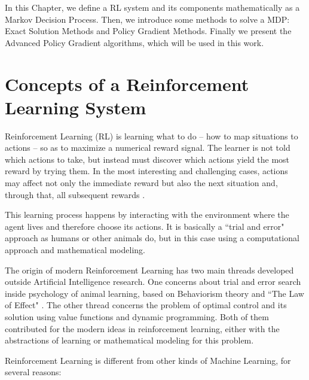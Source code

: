 In this Chapter, we define a RL system and its components mathematically as a Markov Decision Process. Then, we introduce some methods to solve a MDP: Exact Solution Methods and Policy Gradient Methods. Finally we present the Advanced Policy Gradient algorithms, which will be used in this work.

\section{Concepts of a Reinforcement Learning System} \label{sec:rlconcepts}

Reinforcement Learning (RL) is learning what to do -- how to map situations to actions -- so as to maximize
a numerical reward signal. The learner is not told which actions to take, but instead must discover
which actions yield the most reward by trying them. In the most interesting and challenging cases,
actions may affect not only the immediate reward but also the next situation and, through that, all
subsequent rewards \cite{sutton1998rli}.

This learning process happens by interacting with the environment where the agent lives and therefore choose its actions. It is basically a ``trial and error" approach as humans or other animals do, but in this case using a computational approach and mathematical modeling.

The origin of modern Reinforcement Learning has two main threads developed outside Artificial Intelligence research. One concerns about trial and error search inside psychology of animal learning, based on Behaviorism theory \cite{skinner1953science} and ``The Law of Effect" \cite{Thorndike173}. The other thread concerns the problem of optimal control and its solution using value functions
and dynamic programming. Both of them contributed for the modern ideas in reinforcement learning, either with the abstractions of learning or mathematical modeling for this problem.

Reinforcement Learning is different from other kinds of Machine Learning, for several reasons:

